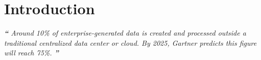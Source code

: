 \section{Introduction}
\begin{displayquote}
\textit{\textbf{\Huge{``}}
\large{Around 10\% of enterprise-generated data is created and processed outside a traditional centralized data center or cloud. By 2025, Gartner predicts this figure will reach 75\%.\cite{gartnerEdgeComputing:online}}
\textbf{\Huge{''}}}
\\[1pt]
\end{displayquote}

% 
% 


% 
% 